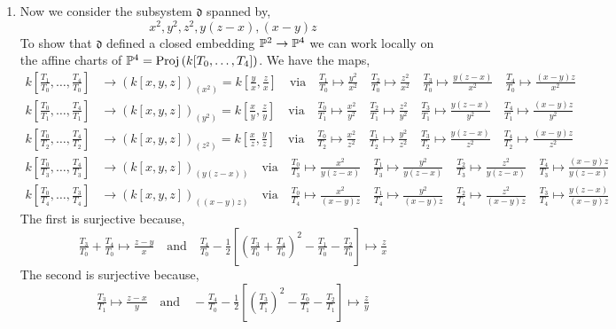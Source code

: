 \documentclass[12pt]{article}
\begin{document}
\begin{enumerate}
\item Now we consider the subsystem $\mathfrak{d}$ spanned by,
\[ x^2, y^2, z^2, y (z - x), (x - y) z \]
To show that $\mathfrak{d}$ defined a closed embedding $\P^2 \to \P^4$ we can work locally on the affine charts of $\P^4 = \Proj{k[T_0, \dots, T_4]}$. We have the maps,
\begin{align*}
k[\tfrac{T_1}{T_0}, \dots, \tfrac{T_4}{T_0}] & \to (k[x,y,z])_{(x^2)} = k[\tfrac{y}{x}, \tfrac{z}{x}] \quad \text{via} \quad \tfrac{T_1}{T_0} \mapsto \tfrac{y^2}{x^2} \quad \tfrac{T_2}{T_0} \mapsto \tfrac{z^2}{x^2} \quad \tfrac{T_3}{T_0} \mapsto \tfrac{y (z - x)}{x^2} \quad \tfrac{T_4}{T_0} \mapsto \tfrac{(x - y)z}{x^2} 
\\
k[\tfrac{T_0}{T_1}, \dots, \tfrac{T_4}{T_1}] & \to (k[x,y,z])_{(y^2)} = k[\tfrac{x}{y}, \tfrac{z}{y}] \quad \text{via} \quad \tfrac{T_0}{T_1} \mapsto \tfrac{x^2}{y^2} \quad \tfrac{T_2}{T_1} \mapsto \tfrac{z^2}{y^2} \quad \tfrac{T_3}{T_1} \mapsto \tfrac{y (z - x)}{y^2} \quad \tfrac{T_4}{T_1} \mapsto \tfrac{(x - y)z}{y^2} 
\\
k[\tfrac{T_0}{T_2}, \dots, \tfrac{T_4}{T_2}] & \to (k[x,y,z])_{(z^2)} = k[\tfrac{x}{z}, \tfrac{y}{z}] \quad \text{via} \quad \tfrac{T_0}{T_2} \mapsto \tfrac{x^2}{z^2} \quad \tfrac{T_1}{T_2} \mapsto \tfrac{y^2}{z^2} \quad \tfrac{T_3}{T_2} \mapsto \tfrac{y (z - x)}{z^2} \quad \tfrac{T_4}{T_2} \mapsto \tfrac{(x - y)z}{z^2}  
\\
k[\tfrac{T_0}{T_3}, \dots, \tfrac{T_4}{T_3}] & \to (k[x,y,z])_{(y(z-x))}  \quad \text{via} \quad \tfrac{T_0}{T_3} \mapsto \tfrac{x^2}{y(z-x)} \quad \tfrac{T_1}{T_3} \mapsto \tfrac{y^2}{y(z-x)} \quad \tfrac{T_2}{T_3} \mapsto \tfrac{z^2}{y(z-x)} \quad \tfrac{T_4}{T_3} \mapsto \tfrac{(x - y)z}{y(z - x)} 
\\
k[\tfrac{T_0}{T_4}, \dots, \tfrac{T_3}{T_4}] & \to (k[x,y,z])_{((x-y)z)} \quad \text{via} \quad \tfrac{T_0}{T_4} \mapsto \tfrac{x^2}{(x-y)z} \quad \tfrac{T_1}{T_4} \mapsto \tfrac{y^2}{(x-y)z} \quad \tfrac{T_2}{T_4} \mapsto \tfrac{z^2}{(x-y)z} \quad \tfrac{T_3}{T_4} \mapsto \tfrac{y(z - x)}{(x - y)z} 
\end{align*}
The first is surjective because,
\[ \tfrac{T_3}{T_0} + \tfrac{T_4}{T_0} \mapsto \tfrac{z - y}{x} \quad \text{and} \quad \tfrac{T_4}{T_0} - \tfrac{1}{2} \left[ \left( \tfrac{T_3}{T_0} + \tfrac{T_4}{T_0} \right)^2 - \tfrac{T_1}{T_0} - \tfrac{T_2}{T_0} \right] \mapsto \tfrac{z}{x} \]
The second is surjective because,
\[ \tfrac{T_3}{T_1} \mapsto \tfrac{z-x}{y} \quad \text{and} \quad - \tfrac{T_4}{T_0} - \tfrac{1}{2} \left[ \left( \tfrac{T_3}{T_1} \right)^2 - \tfrac{T_0}{T_1} - \tfrac{T_2}{T_1} \right] \mapsto \tfrac{z}{y} \]

\end{enumerate}
\end{document}
